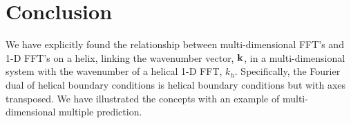 \section{Conclusion}
We have explicitly found the relationship between multi-dimensional
FFT's and 1-D FFT's on a helix, linking the wavenumber vector, ${\bf
k}$, in a multi-dimensional system with the wavenumber 
of a helical 1-D FFT, $k_h$.  
Specifically, the Fourier dual of helical boundary conditions is
helical boundary conditions but with axes transposed.
We have illustrated the concepts with an example of multi-dimensional
multiple prediction.







